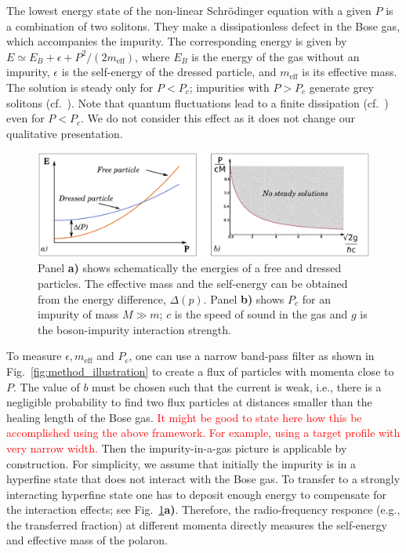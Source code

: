 \documentclass[twocolumn,amsmath,amssymb,showpacs,prl,superscriptaddress,aps]{revtex4-1}
\begin{document}
The lowest energy state of the non-linear Schr{\"o}dinger equation with a given $P$ is a combination of two solitons. They make a dissipationless defect in the Bose gas, which accompanies the impurity. The corresponding energy is given by $E\simeq E_B+\epsilon+P^2/(2m_{\mathrm{eff}})$, where $E_B$ is the energy of the gas without an impurity, $\epsilon$ is the self-energy of the dressed particle, and $m_{\mathrm{eff}}$ is its effective mass. The solution is steady only for $P<P_c$; impurities with $P>P_c$ generate grey solitons (cf.~\cite{hakim1997}). Note that quantum fluctuations lead to a finite dissipation (cf.~\cite{astrakharchik2004,sykes2009,Cherny2012}) even for $P<P_c$. We do not consider this effect as it does not change our qualitative presentation.


\begin{figure}
\centerline{\includegraphics[scale=0.3]{figure3.pdf}}
\caption{Panel {\bf a)} shows schematically the energies of a free and dressed particles. 
The effective mass and the self-energy 
can be obtained from the energy difference, $\Delta(p)$.
Panel {\bf b)} shows $P_c$ for an impurity of mass $M\gg m$; 
$c$ is the speed of sound in the gas and $g$ is the boson-impurity interaction strength.
  }
\label{fig:Figure3}
\end{figure}



To measure $\epsilon, m_{\mathrm{eff}}$ and $P_c$, one can use a narrow band-pass filter as shown in Fig.~\ref{fig:method_illustration} to create a flux of particles with momenta close to $P$. The value of $b$ must be chosen such that the current is weak, i.e., there is a negligible probability to find two flux particles at distances smaller than the healing 
length of the Bose gas. \textcolor{red}{It might be good to state here how this be accomplished using the above framework. For example, using a target profile with very narrow width.} Then the impurity-in-a-gas picture is applicable by construction. 
For simplicity, we assume that initially the impurity is in a hyperfine state 
that does not interact with the Bose gas. To transfer to a strongly interacting hyperfine state 
one has to deposit enough energy to compensate for the interaction effects; see Fig.~\ref{fig:Figure3}{\bf a)}. 
Therefore, the radio-frequency responce (e.g., the transferred fraction) at different momenta directly measures 
the self-energy and effective mass of the polaron.
\end{document}
